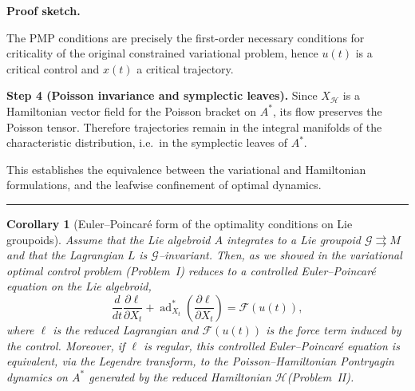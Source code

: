 \documentclass{article}
\newtheorem{corollary}[theorem]{Corollary}
\newenvironment{proof}[1][Proof]{\noindent\textbf{#1.} }{\ \rule{0.5em}{0.5em}}
\begin{document}
\begin{proof}[Proof sketch]

The PMP conditions are precisely the first-order necessary conditions for criticality of the original constrained variational problem, hence $u(t)$ is a critical control and $x(t)$ a critical trajectory.

\medskip
\noindent\textbf{Step 4 (Poisson invariance and symplectic leaves).}
Since $X_{\mathcal H}$ is a Hamiltonian vector field for the Poisson bracket on $A^*$, its flow preserves the Poisson tensor. Therefore trajectories remain in the integral manifolds of the characteristic distribution, i.e.\ in the symplectic leaves of $A^*$.

\medskip
This establishes the equivalence between the variational and Hamiltonian formulations, and the leafwise confinement of optimal dynamics.
\end{proof}
\begin{corollary}[Euler--Poincar\'e form of the optimality conditions on Lie groupoids]
Assume that the Lie algebroid $A$ integrates to a Lie groupoid $\mathcal G\rightrightarrows M$ and that the Lagrangian $L$ is $\mathcal G$--invariant.
Then, as we showed in \cite{HaghighatdoostEPGroupoids} the variational optimal control problem (Problem~I) reduces to a controlled Euler--Poincar\'e equation on the Lie algebroid,
\[
\frac{d}{dt}\frac{\partial \ell}{\partial X_t}
+ \operatorname{ad}^*_{X_t}\!\left(\frac{\partial \ell}{\partial X_t}\right)
= \mathcal F(u(t)),
\]
where $\ell$ is the reduced Lagrangian and $\mathcal F(u(t))$ is the force term induced by the control.
Moreover, if $\ell$ is regular, this controlled Euler--Poincar\'e equation is equivalent, via the Legendre transform, to the Poisson--Hamiltonian Pontryagin dynamics on $A^*$ generated by the reduced Hamiltonian $\mathcal H$(Problem~II).
\end{corollary}
\end{document}
